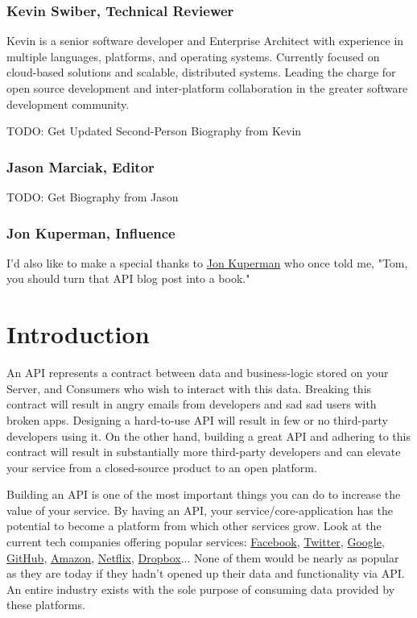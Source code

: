 \documentclass{book}
\begin{document}
\subsubsection*{Kevin Swiber, Technical Reviewer}

Kevin is a senior software developer and Enterprise Architect with experience in multiple languages, platforms, and operating systems. Currently focused on cloud-based solutions and scalable, distributed systems. Leading the charge for open source development and inter-platform collaboration in the greater software development community.

TODO: Get Updated Second-Person Biography from Kevin

\subsubsection*{Jason Marciak, Editor}

TODO: Get Biography from Jason

\subsubsection*{Jon Kuperman, Influence}

I'd also like to make a special thanks to \href{https://twitter.com/thecodeplanet}{Jon Kuperman} who once told me, "Tom, you should turn that API blog post into a book."

\tableofcontents

\newpage

\section*{Introduction}

An API represents a contract between data and business-logic stored on your Server, and Consumers who wish to interact with this data. Breaking this contract will result in angry emails from developers and sad sad users with broken apps. Designing a hard-to-use API will result in few or no third-party developers using it. On the other hand, building a great API and adhering to this contract will result in substantially more third-party developers and can elevate your service from a closed-source product to an open platform.

Building an API is one of the most important things you can do to increase the value of your service. By having an API, your service/core-application has the potential to become a platform from which other services grow. Look at the current tech companies offering popular services: \href{https://developers.facebook.com/}{Facebook}, \href{https://dev.twitter.com/docs/api/1.1}{Twitter}, \href{https://developers.google.com/}{Google}, \href{http://developer.github.com/v3/}{GitHub}, \href{https://developer.amazon.com/}{Amazon}, \href{http://developer.netflix.com/}{Netflix}, \href{https://www.dropbox.com/developers/core/docs}{Dropbox}... None of them would be nearly as popular as they are today if they hadn't opened up their data and functionality via API. An entire industry exists with the sole purpose of consuming data provided by these platforms.
\end{document}
